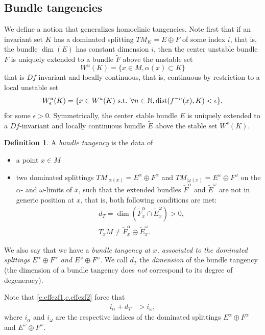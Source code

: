 \documentclass[11pt, a4paper]{amsart}
\theoremstyle{plain}
\theoremstyle{definition}
\newtheorem{definition}{Definition}[proposition]
\theoremstyle{remark}
\numberwithin{equation}{section}         %
\DeclareMathOperator{\dist}{dist}
\def\dist{\operatorname{dist}}
\begin{document}
\subsection{Bundle tangencies}\label{s.bundtang}
We define a notion that generalizes homoclinic tangencies.
Note first that if an invariant set $K$ has a dominated splitting $TM_K=E\oplus F$ of some index $i$, that is, the bundle $\dim(E)$ has constant dimension $i$, then the center unstable bundle $F$ is uniquely extended to a  bundle $\tilde{F}$ above the unstable set 
$$W^u(K)=\{x\in M, \alpha(x)\subset K\}$$
 that is $Df$-invariant and locally continuous, that is, continuous by restriction to a local unstable set
 $$W^u_\epsilon(K)=\{x\in W^u(K) \mbox{ s.t. } \forall n\in \NN, \dist(f^{-n}(x), K)<\epsilon\},$$
 for some $\epsilon>0$.  Symmetrically, the center stable bundle $E$ is uniquely extended to a $Df$-invariant and locally continuous bundle $\tilde{E}$ above the stable set $W^s(K)$.


\begin{definition}
A {\em bundle tangency} is the data of
\begin{itemize}
\item a point $x\in M$
\item two dominated splittings $TM_{|\alpha(x)}=E^\alpha\oplus F^\alpha$ and $TM_{|\omega(x)}=E^\omega\oplus F^\omega$ on the $\alpha$- and $\omega$-limits of $x$, such that 
the extended bundles $\tilde{F}^\alpha$ and $\tilde{E}^\omega$ are not in generic position at $x$, that is, both  following conditions are met: 
\begin{align}
&d_T=\dim(\tilde{F}^\alpha_x\cap \tilde{E}^\omega_x)>0,\label{e.effezf1}\\
&T_xM\neq \tilde{F}^\alpha_x\oplus \tilde{E}^\omega_x \label{e.effezf2}.
\end{align} 
\end{itemize}
\end{definition}

We also say that we have a {\em bundle tangency at $x$, associated to the dominated splttings $E^\alpha\oplus F^\alpha$ and $E^\omega\oplus F^\omega$}.
We call $d_T$ the {\em dimension} of the bundle tangency (the dimension of a bundle tangency does {\em not} correspond to its degree of degeneracy).

Note that \cref{e.effezf1,e.effezf2} force that 
\begin{align}
i_\alpha+d_T&>i_\omega, \label{e.zfef3}
\end{align}
where $i_\alpha$ and $i_\omega$ are the respective indices of the dominated splittings $E^\alpha\oplus F^\alpha$ and $E^\omega\oplus F^\omega$.
\end{document}
